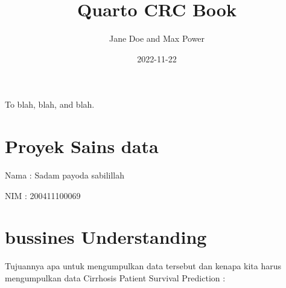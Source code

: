\documentclass[
  letterpaper,
]{krantz}
\title{Quarto CRC Book}
\author{Jane Doe and Max Power}
\date{2022-11-22}
\renewcommand*\contentsname{Table of contents}
\newcommand\contentsname{Table of contents}
\begin{document}
\maketitle

\thispagestyle{empty}

\begin{center}
To blah, blah, and blah.
\end{center}

\setlength{\abovedisplayskip}{-5pt}
\setlength{\abovedisplayshortskip}{-5pt}

\ifdefined\Shaded\renewenvironment{Shaded}{\begin{tcolorbox}[frame hidden, interior hidden, breakable, boxrule=0pt, borderline west={3pt}{0pt}{shadecolor}, sharp corners, enhanced]}{\end{tcolorbox}}\fi

\renewcommand*\contentsname{Table of contents}
{
\hypersetup{linkcolor=}
\setcounter{tocdepth}{2}
\tableofcontents
}

\hypertarget{proyek-sains-data}{%
\chapter*{Proyek Sains data}\label{proyek-sains-data}}


Nama : Sadam payoda sabilillah

NIM : 200411100069


\hypertarget{bussines-understanding}{%
\chapter*{bussines Understanding}\label{bussines-understanding}}


Tujuannya apa untuk mengumpulkan data tersebut dan kenapa kita harus
mengumpulkan data Cirrhosis Patient Survival Prediction :
\end{document}
